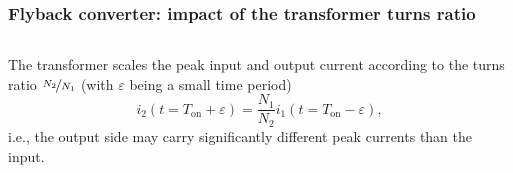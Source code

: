 \begin{frame}
    \frametitle{Flyback converter: impact of the transformer turns ratio}
    \begin{columns}
        \begin{column}{0.5\textwidth}
           The transformer scales the peak input and output current according to the turns ratio $\nicefrac{N_2}{N_1}$ (with $\varepsilon$ being a small time period)
            \begin{equation*}
                i_2(t=T_\mathrm{on}+\varepsilon) = \frac{N_1}{N_2} i_1(t=T_\mathrm{on}-\varepsilon),
            \end{equation*}
            i.e., the output side may carry significantly different peak currents than the input.


\end{column}
\end{columns}
\end{frame}
